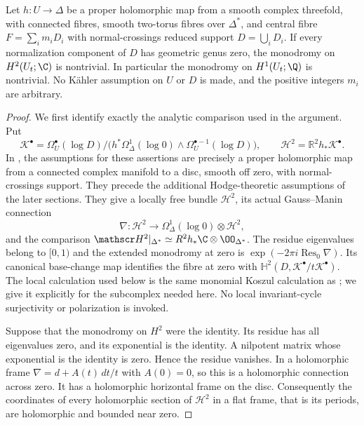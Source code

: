 \begin{proposition}
\label{st:D.2.3}
Let $h:U\to\Delta$ be a proper holomorphic map from a smooth
complex threefold, with connected fibres, smooth two-torus fibres
over $\Delta^*$, and central fibre $F=\sum_i m_iD_i$ with
normal-crossings reduced support $D=\bigcup_iD_i$.
If every normalization component of $D$ has geometric genus zero,
the monodromy on $H^2(U_t;\C)$ is nontrivial. In particular the
monodromy on $H^1(U_t;\Q)$ is nontrivial. No K\"ahler assumption
on $U$ or $D$ is made, and the positive integers $m_i$ are arbitrary.
\end{proposition}
\begin{proof}
We first identify exactly the analytic comparison used in the
argument. Put
\[
\mathscr K^\bullet=
 \Omega_U^\bullet(\log D)\big/
 \bigl(h^*\Omega_\Delta^1(\log0)\wedge
       \Omega_U^{\bullet-1}(\log D)\bigr),\qquad
\mathscr H^2=\mathbb R^2h_*\mathscr K^\bullet.
\]
In \cite[\S2.1, Theorem~2.18, \S2.19, Proposition~2.20 and
Theorem~2.21]{Steenbrink1976}, the assumptions for these assertions
are precisely a proper holomorphic map from a connected complex
manifold to a disc, smooth off zero, with normal-crossings support.
They precede the additional Hodge-theoretic assumptions of the
later sections. They give a locally free bundle $\mathscr H^2$,
its actual Gauss--Manin connection
\[
\nabla:\mathscr H^2\longrightarrow
\Omega_\Delta^1(\log0)\otimes\mathscr H^2,
\]
and the comparison
$\mathscr H^2|_{\Delta^*}\simeq
R^2h_*\C\otimes\OO_{\Delta^*}$.
The residue eigenvalues belong to $[0,1)$ and the extended
monodromy at zero is
$\exp(-2\pi i\operatorname{Res}_0\nabla)$.
Its canonical base-change map identifies the fibre at zero with
$\mathbb H^2(D,\mathscr K^\bullet/t\mathscr K^\bullet)$.
The local calculation used below is the same monomial Koszul
calculation as \cite[Proposition~1.13 and proof of
Proposition~2.20]{Steenbrink1976}; we give it explicitly for the
subcomplex needed here. No local invariant-cycle surjectivity
or polarization is invoked.

Suppose that the monodromy on $H^2$ were the identity. Its
residue has all eigenvalues zero, and its exponential is the
identity. A nilpotent matrix whose exponential is the identity
is zero. Hence the residue vanishes. In a holomorphic frame
$\nabla=d+A(t)\,dt/t$ with $A(0)=0$, so this is a holomorphic
connection across zero. It has a holomorphic horizontal frame
on the disc. Consequently the coordinates of every holomorphic
section of $\mathscr H^2$ in a flat frame, that is its periods,
are holomorphic and bounded near zero.


\end{proof}
